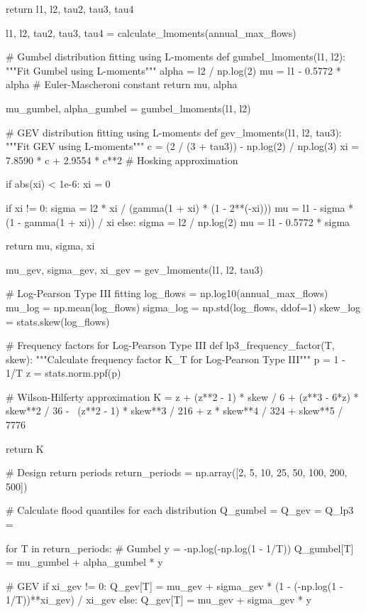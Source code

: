\documentclass[a4paper, 11pt]{article}
\begin{document}
\begin{pycode}
    return l1, l2, tau2, tau3, tau4

l1, l2, tau2, tau3, tau4 = calculate_lmoments(annual_max_flows)

# Gumbel distribution fitting using L-moments
def gumbel_lmoments(l1, l2):
    """Fit Gumbel using L-moments"""
    alpha = l2 / np.log(2)
    mu = l1 - 0.5772 * alpha  # Euler-Mascheroni constant
    return mu, alpha

mu_gumbel, alpha_gumbel = gumbel_lmoments(l1, l2)

# GEV distribution fitting using L-moments
def gev_lmoments(l1, l2, tau3):
    """Fit GEV using L-moments"""
    c = (2 / (3 + tau3)) - np.log(2) / np.log(3)
    xi = 7.8590 * c + 2.9554 * c**2  # Hosking approximation

    if abs(xi) < 1e-6:
        xi = 0

    if xi != 0:
        sigma = l2 * xi / (gamma(1 + xi) * (1 - 2**(-xi)))
        mu = l1 - sigma * (1 - gamma(1 + xi)) / xi
    else:
        sigma = l2 / np.log(2)
        mu = l1 - 0.5772 * sigma

    return mu, sigma, xi

mu_gev, sigma_gev, xi_gev = gev_lmoments(l1, l2, tau3)

# Log-Pearson Type III fitting
log_flows = np.log10(annual_max_flows)
mu_log = np.mean(log_flows)
sigma_log = np.std(log_flows, ddof=1)
skew_log = stats.skew(log_flows)

# Frequency factors for Log-Pearson Type III
def lp3_frequency_factor(T, skew):
    """Calculate frequency factor K_T for Log-Pearson Type III"""
    p = 1 - 1/T
    z = stats.norm.ppf(p)

    # Wilson-Hilferty approximation
    K = z + (z**2 - 1) * skew / 6 + (z**3 - 6*z) * skew**2 / 36 - \
        (z**2 - 1) * skew**3 / 216 + z * skew**4 / 324 + skew**5 / 7776

    return K

# Design return periods
return_periods = np.array([2, 5, 10, 25, 50, 100, 200, 500])

# Calculate flood quantiles for each distribution
Q_gumbel = {}
Q_gev = {}
Q_lp3 = {}

for T in return_periods:
    # Gumbel
    y = -np.log(-np.log(1 - 1/T))
    Q_gumbel[T] = mu_gumbel + alpha_gumbel * y

    # GEV
    if xi_gev != 0:
        Q_gev[T] = mu_gev + sigma_gev * (1 - (-np.log(1 - 1/T))**xi_gev) / xi_gev
    else:
        Q_gev[T] = mu_gev + sigma_gev * y


\end{pycode}
\end{document}
